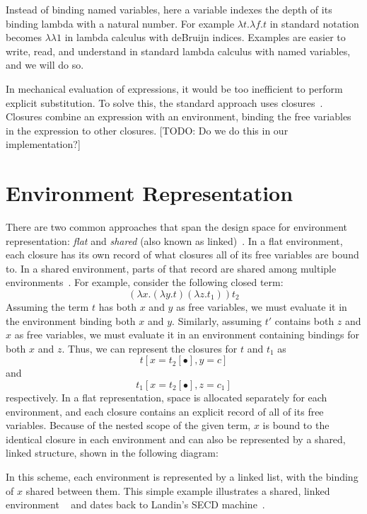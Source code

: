 \documentclass[preprint]{sigplanconf}
\begin{document}
Instead of binding named variables, here a variable indexes the depth of its
binding lambda with a natural number. For example $\lambda t.\lambda f.t$ in
standard notation becomes $\lambda\lambda1$ in lambda calculus with deBruijn
indices.  Examples are easier to write, read, and understand in standard lambda
calculus with named variables, and we will do so.

In mechanical evaluation of expressions, it would be too inefficient to perform
explicit substitution. To solve this, the standard approach uses
closures~\cite{landin1964mechanical, curien1991abstract, jonesstg, biernacka2007concrete}.
Closures combine an expression with an environment, binding the free
variables in the expression to other closures.  [TODO: Do we do this
in our implementation?]

\section{Environment Representation} \label{sec:env}

There are two common approaches that span the design space for environment
representation: \emph{flat} and \emph{shared} (also
known as linked)~\cite{appel1988optimizing, shao1994space}. In a flat
environment, each closure has its own record of what closures all
of its free variables are bound to. In a shared environment, parts
of that record are shared among multiple environments~\cite{appel1988optimizing,
shao1994space}. For example, consider the following closed term: $$(\lambda
x.(\lambda y.t) (\lambda z.t_1)) t_2$$ Assuming the term $t$ has both $x$ and
$y$ as free variables, we must evaluate it in the environment binding both $x$
and $y$.  Similarly, assuming $t'$ contains both $z$ and $x$ as free variables,
we must evaluate it in an environment containing bindings for both $x$ and $z$.
Thus, we can represent the closures for $t$ and $t_1$ as
$$t[x=t_2[\bullet], y=c]$$ and $$t_1[x=t_2[\bullet], z=c_1]$$ respectively. In a
flat representation, space is allocated separately for each
environment, and each closure contains
an explicit record of all of its free variables. Because of the nested scope of
the given term, $x$ is bound to the identical closure in each
environment and can also be represented by a shared, linked
structure, shown in the following
diagram:

\begin{center}
\end{center}
In this scheme, each environment is represented by a linked list, with
the binding of $x$ shared between them. This simple example
illustrates a shared, linked environment ~\cite{appel1988optimizing}
and dates back to Landin's SECD machine~\cite{landin1964mechanical}.
\end{document}
